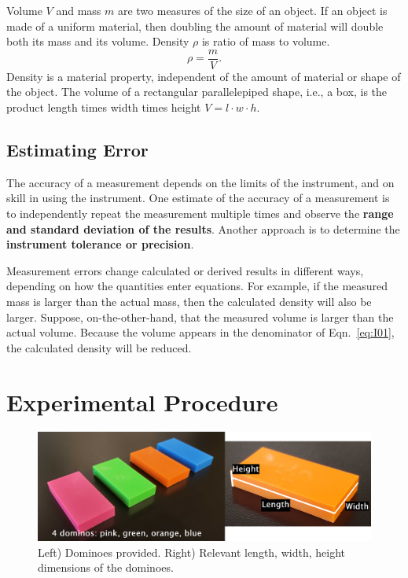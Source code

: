 Volume $V$ and mass $m$ are two measures of the size of an object. If an object is made of a uniform material, then doubling the amount of material will double both its mass and its volume.  
Density $\rho$ is ratio of mass to volume. 
\begin{equation} \label{eq:I01}
	\rho=\frac{m}{V}.
\end{equation}
Density is a material property, independent of the amount of material or shape of the object. 
The volume of a rectangular parallelepiped shape, i.e., a box, is the product length times width times height \(V=l\cdot w\cdot h\).


\subsection{Estimating Error}
The accuracy of a measurement depends on the limits of the instrument, and on skill in using the instrument.
One estimate of the accuracy of a measurement is to independently repeat the measurement multiple times and observe the \textbf{range and standard deviation of the results}. Another approach is to determine the \textbf{instrument tolerance or precision}.  

Measurement errors change calculated or derived results in different ways, depending on how the quantities enter equations. 
For example, if the measured mass is larger than the actual mass, then the calculated density will also be larger. 
Suppose, on-the-other-hand, that the measured volume is larger than the actual volume.  Because the volume appears in the denominator of Eqn.~\ref{eq:I01}, the calculated density will be reduced. 


\section{Experimental Procedure}

\begin{figure}[h]
  \begin{center}
    \includegraphics[width=4.9in]{Fall/Experiment00Figures/M0_dominos.png}
  \end{center}
  \caption{Left) Dominoes provided. Right) Relevant length, width, height dimensions of the dominoes.}
  \label{M00Fig01}
\end{figure}

